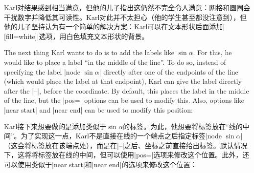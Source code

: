 Karl对结果感到相当满意，但他的儿子指出这仍然不完全令人满意：网格和圆圈会干扰数字并降低其可读性。Karl对此并不太担心（他的学生甚至都没注意到），但他的儿子坚持认为有一个简单的解决方案：Karl可以在文本形状后面添加|[fill=white]|选项，用白色填充文本形状的背景。


The next thing Karl wants to do is to add the labels like $\sin \alpha$. For
this, he would like to place a label ``in the middle of the line''. To do so,
instead of specifying the label |node {$\sin\alpha$}|  directly after one of
the endpoints of the line (which would place the label at that endpoint), Karl
can give the label directly after the |--|, before the coordinate. By default,
this places the label in the middle of the line, but the |pos=| options can be
used to modify this. Also, options like |near start| and |near end| can be used
to modify this position:

Karl接下来想要做的是添加类似于$\sin \alpha$的标签。为此，他想要将标签放在``线的中间''。为了实现这一点，Karl不是直接在线的一个端点之后指定标签|node {$\sin\alpha$}|（这会将标签放在该端点处），而是在|--|之后、坐标之前直接给出标签。默认情况下，这将将标签放在线的中间，但可以使用|pos=|选项来修改这个位置。此外，还可以使用类似于|near start|和|near end|的选项来修改这个位置：


\begin{codeexample}[preamble={\usetikzlibrary{intersections}}]
\end{codeexample}

